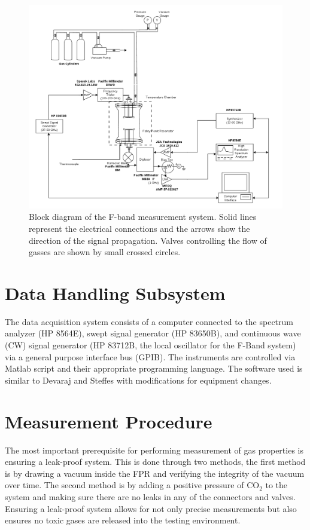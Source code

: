 \begin{figure}[H]
    \centering
	\includegraphics[width=1\textwidth]{./images/f-bandsystem.png}
	\caption{Block diagram of the F-band measurement system. Solid lines represent the electrical connections and the arrows show the direction of the signal propagation. Valves controlling the flow of gasses are shown by small crossed circles.  }
    \label{fig:fbandimage}
\end{figure}

\section{Data Handling Subsystem}

The data acquisition system consists of a computer connected to the spectrum analyzer (HP 8564E), swept signal generator (HP 83650B), and continuous wave (CW) signal generator (HP 83712B, the local oscillator for the F-Band system) via a general purpose interface bus (GPIB). The instruments are controlled via Matlab script and their appropriate programming language. The software used is similar to Devaraj and Steffes \cite{Devaraj-thesis, Devaraj-2011} with modifications for equipment changes.

\section{Measurement Procedure}

The most important prerequisite for performing measurement of gas properties is ensuring a leak-proof system. This is done through two methods, the first method is by drawing a vacuum inside the FPR and verifying the integrity of the vacuum over time. The second method is by adding a positive pressure of CO$_2$ to the system and making sure there are no leaks in any of the connectors and valves. Ensuring a leak-proof system allows for not only precise measurements but also ensures no toxic gases are released into the testing environment.


